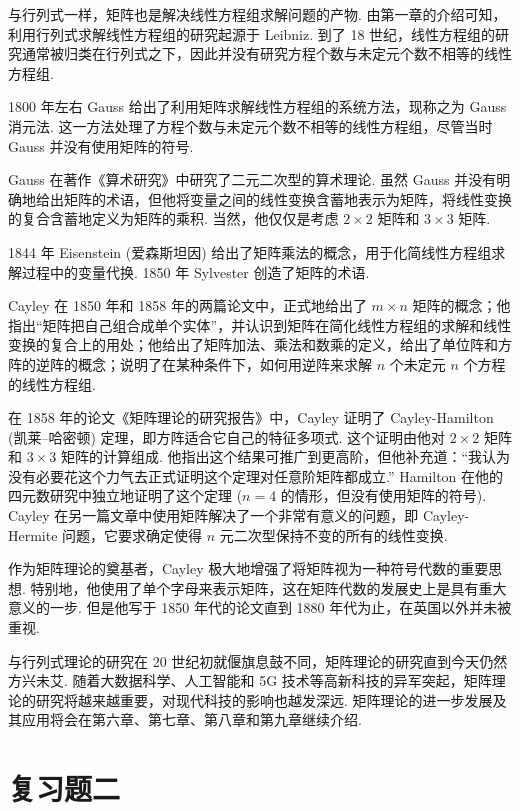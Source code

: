 \documentclass[UTF8,12pt,a4paper,fontset=fandol]{ctexart}
\begin{document}
与行列式一样，矩阵也是解决线性方程组求解问题的产物. 由第一章的介绍可知，利用行列式求解线性方程组的研究起源于 Leibniz. 到了 18 世纪，线性方程组的研究通常被归类在行列式之下，因此并没有研究方程个数与未定元个数不相等的线性方程组.

1800 年左右 Gauss 给出了利用矩阵求解线性方程组的系统方法，现称之为 Gauss 消元法. 这一方法处理了方程个数与未定元个数不相等的线性方程组，尽管当时 Gauss 并没有使用矩阵的符号.

Gauss 在著作《算术研究》中研究了二元二次型的算术理论. 虽然 Gauss 并没有明确地给出矩阵的术语，但他将变量之间的线性变换含蓄地表示为矩阵，将线性变换的复合含蓄地定义为矩阵的乘积. 当然，他仅仅是考虑 $2\times 2$ 矩阵和 $3\times 3$ 矩阵.

1844 年 Eisenstein (爱森斯坦因) 给出了矩阵乘法的概念，用于化简线性方程组求解过程中的变量代换. 1850 年 Sylvester 创造了矩阵的术语.

Cayley 在 1850 年和 1858 年的两篇论文中，正式地给出了 $m\times n$ 矩阵的概念；他指出“矩阵把自己组合成单个实体”，并认识到矩阵在简化线性方程组的求解和线性变换的复合上的用处；他给出了矩阵加法、乘法和数乘的定义，给出了单位阵和方阵的逆阵的概念；说明了在某种条件下，如何用逆阵来求解 $n$ 个未定元 $n$ 个方程的线性方程组.

在 1858 年的论文《矩阵理论的研究报告》中，Cayley 证明了 Cayley-Hamilton (凯莱--哈密顿) 定理，即方阵适合它自己的特征多项式. 这个证明由他对 $2\times 2$ 矩阵和 $3\times 3$ 矩阵的计算组成. 他指出这个结果可推广到更高阶，但他补充道：“我认为没有必要花这个力气去正式证明这个定理对任意阶矩阵都成立.” Hamilton 在他的四元数研究中独立地证明了这个定理 ($n=4$ 的情形，但没有使用矩阵的符号). Cayley 在另一篇文章中使用矩阵解决了一个非常有意义的问题，即 Cayley-Hermite 问题，它要求确定使得 $n$ 元二次型保持不变的所有的线性变换.

作为矩阵理论的奠基者，Cayley 极大地增强了将矩阵视为一种符号代数的重要思想. 特别地，他使用了单个字母来表示矩阵，这在矩阵代数的发展史上是具有重大意义的一步. 但是他写于 1850 年代的论文直到 1880 年代为止，在英国以外并未被重视.

与行列式理论的研究在 20 世纪初就偃旗息鼓不同，矩阵理论的研究直到今天仍然方兴未艾. 随着大数据科学、人工智能和 5G 技术等高新科技的异军突起，矩阵理论的研究将越来越重要，对现代科技的影响也越发深远. 矩阵理论的进一步发展及其应用将会在第六章、第七章、第八章和第九章继续介绍.

\section*{复习题二}
\end{document}
